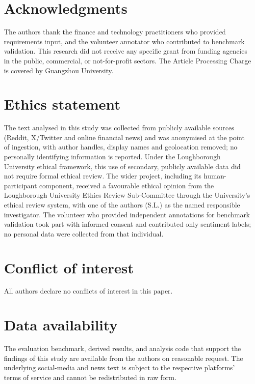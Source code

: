 \documentclass{aims}
\numberwithin{equation}{section}
\begin{document}
\section*{Acknowledgments}
The authors thank the finance and technology practitioners who provided
requirements input, and the volunteer annotator who contributed to benchmark
validation. This research did not receive any specific grant
from funding agencies in the public, commercial, or not-for-profit sectors. The
Article Processing Charge is covered by Guangzhou University.

\section*{Ethics statement}
The text analysed in this study was collected from publicly available sources
(Reddit, X/Twitter and online financial news) and was anonymised at the point of
ingestion, with author handles, display names and geolocation removed; no
personally identifying information is reported. Under the Loughborough University
ethical framework, this use of secondary, publicly available data did not require
formal ethical review. The wider project, including its human-participant component,
received a favourable ethical opinion from the Loughborough University Ethics Review
Sub-Committee through the University's ethical review system, with one of the
authors (S.L.) as the named responsible investigator. The volunteer who provided
independent annotations for
benchmark validation took part with informed consent and contributed only sentiment
labels; no personal data were collected from that individual.

\section*{Conflict of interest}
All authors declare no conflicts of interest in this paper.

\section*{Data availability}
The evaluation benchmark, derived results, and analysis code that support the
findings of this study are available from the authors on reasonable request. The
underlying social-media and news text is subject to the respective platforms' terms
of service and cannot be redistributed in raw form.

\end{document}
